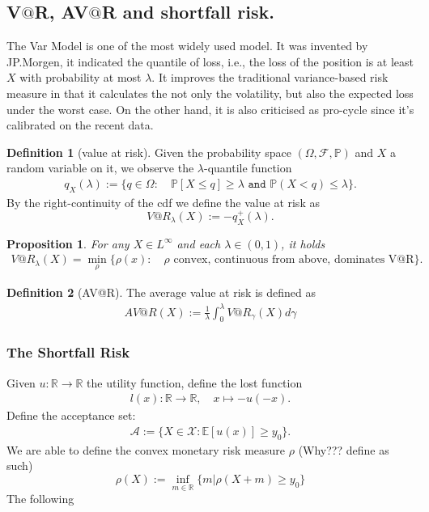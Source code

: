 \documentclass[a4paper,11pt]{book}
\newtheorem{proposition}[theorem]{Proposition}
\theoremstyle{definition}
\newtheorem{definition}{Definition}[section]
\theoremstyle{remark}
\begin{document}
\subsection{V$@$R, AV$@$R and shortfall risk.}
The Var Model is one of the most widely used model. It was invented by JP.Morgen, it indicated the quantile of loss, i.e., the loss of the position is at least $X$ with probability at most $\lambda$. It improves the traditional variance-based risk measure in that it calculates the not only the volatility, but also the expected loss under the worst case. On the other hand, it is also criticised as pro-cycle since it's calibrated on the recent data. 
\begin{definition}[value at risk]
	Given the probability space $(\Omega, \mathcal{F}, \mathbb{P})$ and $X$ a random variable on it, we observe the $\lambda$-quantile function
	\begin{align*}
		q_X(\lambda):= \{q \in \Omega:\quad \mathbb{P}[X \le q] \ge \lambda \texttt{ and } \mathbb{P}(X < q) \le \lambda \}. 
	\end{align*}
	By the right-continuity of the cdf we define the value at risk as
	\begin{equation}
		V@R_\lambda(X):= -q^+_X(\lambda). 
	\end{equation}
\end{definition}

\begin{proposition}
	For any $X \in L^\infty$ and each $\lambda \in (0, 1)$, it holds
	\begin{align*}
		V@R_\lambda(X) = \min_\rho \{ \rho(x): \quad \rho \text{ convex,  continuous from above, dominates V@R} \}.  
	\end{align*}
\end{proposition}

\begin{definition}[AV@R]
The average value at risk is defined as
\begin{align*}
	AV@R (X):= \frac{1}{\lambda} \int_0^\lambda V@R_\gamma (X) d\gamma
\end{align*}
\end{definition}


\subsubsection{The Shortfall Risk}
Given $u: \mathbb{R} \rightarrow \mathbb{R}$ the utility function, define the lost function
\begin{align*}
	l(x): \mathbb{R} \rightarrow \mathbb{R}, \quad x \mapsto - u(-x). 
\end{align*}
Define the acceptance set:
\begin{align*}
	\mathcal{A} := \{ X \in \mathcal{X}:  \mathbb{E}[u(x)] \ge y_0 \}.
\end{align*}
We are able to define the convex monetary risk measure $\rho$ (Why??? define as such)
\begin{equation}
	\rho(X):= \inf_{ m \in \mathbb{R}} \{ m |\rho(X + m) \ge y_0 \}
\end{equation}
The following 
\end{document}
